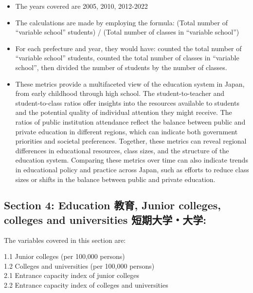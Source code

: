 \documentclass[
  12pt,
  letterpaper,
  DIV=11,
  numbers=noendperiod]{scrartcl}
\begin{document}
\begin{itemize}
\item
  The years covered are 2005, 2010, 2012-2022
\item
  The calculations are made by employing the formula: (Total number of
  ``variable school'' students) / (Total number of classes in ``variable
  school'')
\item
  For each prefecture and year, they would have: counted the total
  number of ``variable school'' students, counted the total number of
  classes in ``variable school'', then divided the number of students by
  the number of classes.
\item
  These metrics provide a multifaceted view of the education system in
  Japan, from early childhood through high school. The
  student-to-teacher and student-to-class ratios offer insights into the
  resources available to students and the potential quality of
  individual attention they might receive. The ratios of public
  institution attendance reflect the balance between public and private
  education in different regions, which can indicate both government
  priorities and societal preferences. Together, these metrics can
  reveal regional differences in educational resources, class sizes, and
  the structure of the education system. Comparing these metrics over
  time can also indicate trends in educational policy and practice
  across Japan, such as efforts to reduce class sizes or shifts in the
  balance between public and private education.
\end{itemize}

\hypertarget{section-4-education-ux6559ux80b2-junior-colleges-colleges-and-universities-ux77edux671fux5927ux5b66ux5927ux5b66}{%
\subsection{Section 4: Education 教育, Junior colleges, colleges and
universities
短期大学・大学:}\label{section-4-education-ux6559ux80b2-junior-colleges-colleges-and-universities-ux77edux671fux5927ux5b66ux5927ux5b66}}

The variables covered in this section are:

1.1 Junior colleges (per 100,000 persons)\\
1.2 Colleges and universities (per 100,000 persons)\\

2.1 Entrance capacity index of junior colleges\\
2.2 Entrance capacity index of colleges and universities
\end{document}
